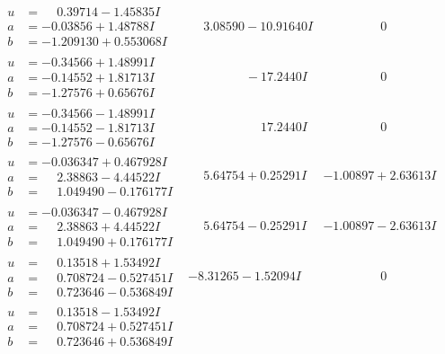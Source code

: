 \documentclass[1p]{elsarticle_modified}
\theoremstyle{definition}
\begin{document}
$$\begin{array}{c|c|c}
\begin{aligned}
u &= \phantom{-}0.39714 - 1.45835 I \\
a &= -0.03856 + 1.48788 I \\
b &= -1.209130 + 0.553068 I\end{aligned}
 & \phantom{-}3.08590 - 10.91640 I & \phantom{-0.000000 } 0 \\ \hline\begin{aligned}
u &= -0.34566 + 1.48991 I \\
a &= -0.14552 + 1.81713 I \\
b &= -1.27576 + 0.65676 I\end{aligned}
 & \phantom{-0.000000 } -17.2440 I & \phantom{-0.000000 } 0 \\ \hline\begin{aligned}
u &= -0.34566 - 1.48991 I \\
a &= -0.14552 - 1.81713 I \\
b &= -1.27576 - 0.65676 I\end{aligned}
 & \phantom{-0.000000 -}17.2440 I & \phantom{-0.000000 } 0 \\ \hline\begin{aligned}
u &= -0.036347 + 0.467928 I \\
a &= \phantom{-}2.38863 - 4.44522 I \\
b &= \phantom{-}1.049490 - 0.176177 I\end{aligned}
 & \phantom{-}5.64754 + 0.25291 I & -1.00897 + 2.63613 I \\ \hline\begin{aligned}
u &= -0.036347 - 0.467928 I \\
a &= \phantom{-}2.38863 + 4.44522 I \\
b &= \phantom{-}1.049490 + 0.176177 I\end{aligned}
 & \phantom{-}5.64754 - 0.25291 I & -1.00897 - 2.63613 I \\ \hline\begin{aligned}
u &= \phantom{-}0.13518 + 1.53492 I \\
a &= \phantom{-}0.708724 - 0.527451 I \\
b &= \phantom{-}0.723646 - 0.536849 I\end{aligned}
 & -8.31265 - 1.52094 I & \phantom{-0.000000 } 0 \\ \hline\begin{aligned}
u &= \phantom{-}0.13518 - 1.53492 I \\
a &= \phantom{-}0.708724 + 0.527451 I \\
b &= \phantom{-}0.723646 + 0.536849 I\end{aligned}

\end{array}$$
\end{document}
